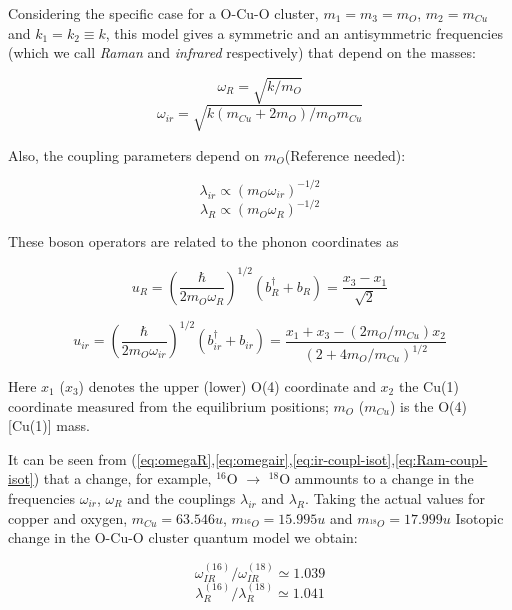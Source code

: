 Considering the specific case for a O-Cu-O cluster, $m_1=m_3=m_O$, $m_2=m_{Cu}$ and $k_1=k_2\equiv k$, this model gives a symmetric and an antisymmetric frequencies (which we call \textit{Raman} and \textit{infrared} respectively) that depend on the masses: 

\begin{equation}\label{eq:omegaR}
\omega_{R}= \sqrt{k/m_O}
\end{equation}
\begin{equation}\label{eq:omegair}
\omega_{ir} = \sqrt{k(m_{Cu}+2m_O)/m_Om_{Cu}}
\end{equation}

Also, the coupling parameters depend on $m_O$(Reference needed):

\begin{equation}\label{eq:ir-coupl-isot}
\lambda_{ir}\propto (m_O\omega_{ir})^{-1/2}
\end{equation}
\begin{equation}\label{eq:Ram-coupl-isot}
\lambda_R\propto (m_O\omega_{R})^{-1/2}
\end{equation}

These boson operators are related to the phonon coordinates as

\begin{equation}\label{eq:Ram-coord}
u_R = \left(\frac{\hbar}{2m_O \omega_R}\right)^{1/2}(b_R^\dagger + b_R) = \frac{x_3 - x_1}{\sqrt{2}}
\end{equation}

\begin{equation}\label{eq:ir-coord}
u_{ir} = \left(\frac{\hbar}{2m_O \omega_{ir}}\right)^{1/2}(b_{ir}^\dagger + b_{ir}) = \frac{x_1 + x_3 - (2m_O/m_{Cu})x_2}{(2 + 4m_O/m_{Cu})^{1/2}}
\end{equation}

Here $x_1$ ($x_3$) denotes the upper (lower) O(4) coordinate and $x_2$  the Cu(1) coordinate measured from the equilibrium positions;   $m_O$ ($m_{Cu}$) is the O(4) [Cu(1)] mass.

It can be seen from (\ref{eq:omegaR},\ref{eq:omegair},\ref{eq:ir-coupl-isot},\ref{eq:Ram-coupl-isot}) that a change, for example, $^{16}$O $\rightarrow$ $^{18}$O ammounts to a change in the frequencies  $\omega_{ir}$, $\omega_R$ and the couplings $\lambda_{ir}$ and $\lambda_R$. Taking the actual values for copper and oxygen, $m_{Cu}=63.546u$, $m_{^{16}O}=15.995u$ and $m_{^{18}O}=17.999u$ Isotopic change in the O-Cu-O cluster quantum model we obtain:

\begin{equation}\label{eq:omega-ir-isot}
\omega^{(16)}_{IR} / \omega^{(18)}_{IR} \simeq 1.039
\end{equation}
\begin{equation}\label{eq:lambda-ir-isot}
\lambda_R^{(16)} / \lambda_R^{(18)} \simeq 1.041
\end{equation}


